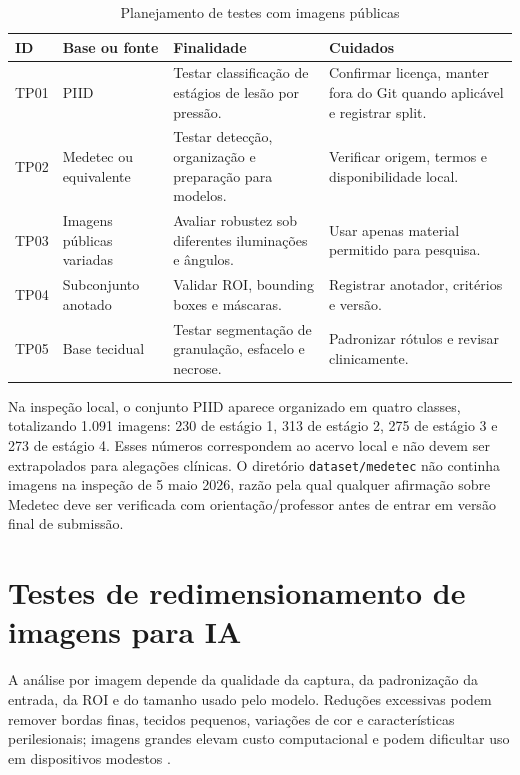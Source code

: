 \documentclass[
    12pt,
    oneside,
    a4paper,
    chapter=TITLE,
    brazil,
    sumario=tradicional,
    hidelinks
]{abntex2}
\begin{document}
\begin{table}[htbp]
    \centering
    \caption{\label{tab:bases-publicas}Planejamento de testes com imagens públicas}
    \begin{tabular}{L{1.4cm}L{3.2cm}L{4.2cm}L{4.2cm}}
        \toprule
        \textbf{ID} & \textbf{Base ou fonte} & \textbf{Finalidade} & \textbf{Cuidados} \\
        \midrule
        TP01 & PIID & Testar classificação de estágios de lesão por pressão. & Confirmar licença, manter fora do Git quando aplicável e registrar split. \\
        TP02 & Medetec ou equivalente & Testar detecção, organização e preparação para modelos. & Verificar origem, termos e disponibilidade local. \\
        TP03 & Imagens públicas variadas & Avaliar robustez sob diferentes iluminações e ângulos. & Usar apenas material permitido para pesquisa. \\
        TP04 & Subconjunto anotado & Validar ROI, bounding boxes e máscaras. & Registrar anotador, critérios e versão. \\
        TP05 & Base tecidual & Testar segmentação de granulação, esfacelo e necrose. & Padronizar rótulos e revisar clinicamente. \\
        \bottomrule
    \end{tabular}
\end{table}

Na inspeção local, o conjunto PIID aparece organizado em quatro classes, totalizando 1.091 imagens: 230 de estágio 1, 313 de estágio 2, 275 de estágio 3 e 273 de estágio 4. Esses números correspondem ao acervo local e não devem ser extrapolados para alegações clínicas. O diretório \texttt{dataset/medetec} não continha imagens na inspeção de 5 maio 2026, razão pela qual qualquer afirmação sobre Medetec deve ser verificada com orientação/professor antes de entrar em versão final de submissão.

\chapter{Testes de redimensionamento de imagens para IA}

A análise por imagem depende da qualidade da captura, da padronização da entrada, da ROI e do tamanho usado pelo modelo. Reduções excessivas podem remover bordas finas, tecidos pequenos, variações de cor e características perilesionais; imagens grandes elevam custo computacional e podem dificultar uso em dispositivos modestos \cite{anisuzzaman2022,dabas2023}.
\end{document}
